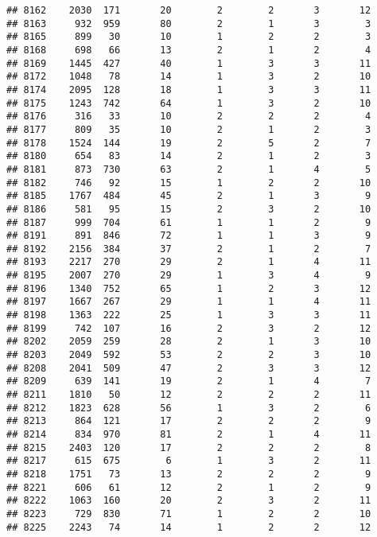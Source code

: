\documentclass[]{article}
\begin{document}
\begin{verbatim}
## 8162    2030  171       20        2        2       3       12
## 8163     932  959       80        2        1       3        3
## 8165     899   30       10        1        2       2        3
## 8168     698   66       13        2        1       2        4
## 8169    1445  427       40        1        3       3       11
## 8172    1048   78       14        1        3       2       10
## 8174    2095  128       18        1        3       3       11
## 8175    1243  742       64        1        3       2       10
## 8176     316   33       10        2        2       2        4
## 8177     809   35       10        2        1       2        3
## 8178    1524  144       19        2        5       2        7
## 8180     654   83       14        2        1       2        3
## 8181     873  730       63        2        1       4        5
## 8182     746   92       15        1        2       2       10
## 8185    1767  484       45        2        1       3        9
## 8186     581   95       15        2        3       2       10
## 8187     999  704       61        1        1       2        9
## 8191     891  846       72        1        1       3        9
## 8192    2156  384       37        2        1       2        7
## 8193    2217  270       29        2        1       4       11
## 8195    2007  270       29        1        3       4        9
## 8196    1340  752       65        1        2       3       12
## 8197    1667  267       29        1        1       4       11
## 8198    1363  222       25        1        3       3       11
## 8199     742  107       16        2        3       2       12
## 8202    2059  259       28        2        1       3       10
## 8203    2049  592       53        2        2       3       10
## 8208    2041  509       47        2        3       3       12
## 8209     639  141       19        2        1       4        7
## 8211    1810   50       12        2        2       2       11
## 8212    1823  628       56        1        3       2        6
## 8213     864  121       17        2        2       2        9
## 8214     834  970       81        2        1       4       11
## 8215    2403  120       17        2        2       2        8
## 8217     615  675        6        1        3       2       11
## 8218    1751   73       13        2        2       2        9
## 8221     606   61       12        2        1       2        9
## 8222    1063  160       20        2        3       2       11
## 8223     729  830       71        1        2       2       10
## 8225    2243   74       14        1        2       2       12

\end{verbatim}
\end{document}
